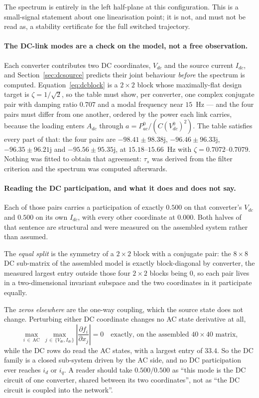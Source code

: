 \documentclass[12pt,a4paper]{article}
\theoremstyle{remark}
\begin{document}
The spectrum is entirely in the left half-plane at this configuration. This is a
small-signal statement about one linearisation point; it is not, and must not be
read as, a stability certificate for the full switched trajectory.

\paragraph{The DC-link modes are a check on the model, not a free observation.}
Each converter contributes two DC coordinates, $V_{dc}$ and the source current
$I_{dc}$, and Section~\ref{sec:dcsource} predicts their joint behaviour
\emph{before} the spectrum is computed. Equation~\eqref{eq:dcblock} is a
$2\times2$ block whose maximally-flat design target is $\zeta=1/\sqrt2$, so the
table must show, per converter, one complex conjugate pair with damping ratio
$0.707$ and a modal frequency near $15$~Hz --- and the four pairs must differ from
one another, ordered by the power each link carries, because the loading enters
$A_{dc}$ through $a=P_{ac}^{0}/(C(V_{dc}^{0})^{2})$. The table satisfies every
part of that: the four pairs are
$-98.41\pm98.38\mathrm{j}$, $-96.46\pm96.33\mathrm{j}$,
$-96.35\pm96.21\mathrm{j}$ and $-95.56\pm95.35\mathrm{j}$, at
$15.18$--$15.66$~Hz with $\zeta=0.7072$--$0.7079$. Nothing was fitted to obtain
that agreement: $\tau_s$ was derived from the filter criterion and the spectrum
was computed afterwards.

\paragraph{Reading the DC participation, and what it does and does not say.}
Each of those pairs carries a participation of exactly $0.500$ on that
converter's $V_{dc}$ and $0.500$ on its own $I_{dc}$, with every other
coordinate at $0.000$. Both halves of that sentence are structural and were
measured on the assembled system rather than assumed.

The \emph{equal split} is the symmetry of a $2\times2$ block with a conjugate
pair: the $8\times8$ DC sub-matrix of the assembled model is exactly
block-diagonal by converter, the measured largest entry outside those four
$2\times2$ blocks being $0$, so each pair lives in a two-dimensional invariant
subspace and the two coordinates in it participate equally.

The \emph{zeros elsewhere} are the one-way coupling, which the source state does
not change. Perturbing either DC coordinate changes no AC state derivative at
all,
\begin{equation}
  \max_{i\,\in\,\mathrm{AC}}\ \max_{j\,\in\,\{V_{dc},I_{dc}\}}
  \left|\frac{\partial f_i}{\partial x_j}\right| = 0
  \quad\text{exactly, on the assembled } 40\times40 \text{ matrix,}
  \label{eq:oneway}
\end{equation}
while the DC rows do read the AC states, with a largest entry of $33.4$. So the
DC family is a closed sub-system driven by the AC side, and no DC participation
ever reaches $i_d$ or $i_q$. A reader should take $0.500/0.500$ as ``this mode is
the DC circuit of one converter, shared between its two coordinates'', not as
``the DC circuit is coupled into the network''.
\end{document}
